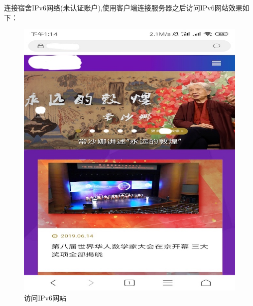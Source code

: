 连接宿舍IPv6网络(未认证账户),使用客户端连接服务器之后访问IPv6网站效果如下：
\begin{figure}[!ht]
	\begin{center}
	\includegraphics[scale=.58]{tsinghua.jpeg}
	\end{center}
	\caption{访问IPv6网站}
	\label{figure:访问IPv6网站}
\end{figure}

